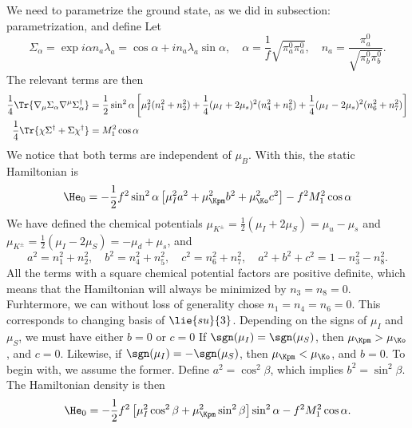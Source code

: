 \documentclass{book}
\begin{document}
We need to parametrize the ground state, as we did in {subsection: parametrization}, and define
Let
%
\begin{equation}
    \Sigma_\alpha 
    = \exp{i \alpha n_a \lambda_a} = \cos \alpha + i n_a \lambda_a \sin \alpha,
    \quad \alpha = \frac{1}{f} \sqrt{\pi_a^0 \pi_a^0}, \quad n_a = \frac{\pi_a^0}{\sqrt{\pi_b^0 \pi_b^0}}. 
\end{equation}
%
The relevant terms are then
%
\begin{align}
    \frac{1}{4} \Tr{\nabla_\mu \Sigma_\alpha \nabla^\mu \Sigma_\alpha^\dagger}
    & = \frac{1}{2} \sin^2\alpha
    \left[
        \mu_I^2 (n_1^2 + n_2^2) 
        + \frac{1}{4} (\mu_I + 2\mu_s)^2(n_4^2 + n_5^2)
        + \frac{1}{4} (\mu_I - 2\mu_s)^2(n_6^2 + n_7^2)
    \right]\\
    \frac{1}{4} \Tr{\chi \Sigma^\dagger + \Sigma \chi^\dagger} 
    & = M_1^2 \cos \alpha
\end{align}
%
We notice that both terms are independent of $\mu_B$.
With this, the static Hamiltonian is
%
\begin{align}
    \He_0
    = -\frac{1}{2}f^2\sin^2\alpha
    \left[
        \mu_I^2a^2 + \mu_\Kpm^2 b^2  + \mu_\Ko^2 c^2
    \right]
    - f^2M_1^2 \cos\alpha
\end{align}
%
We have defined the chemical potentials $\mu_{K^{\pm}} = \frac{1}{2}(\mu_I + 2 \mu_S) = \mu_u - \mu_s$ and $\mu_{K^{\pm}} = \frac{1}{2}(\mu_I - 2 \mu_S) = -\mu_d + \mu_s$, 
and
%
\begin{equation}
    a^2 = n_1^2 + n_2^2, \quad
    b^2 = n_4^2 + n_5^2, \quad
    c^2 = n_6^2 + n_7^2, \quad
    a^2 + b^2 + c^2 = 1 - n_3^2 - n_8^2.
\end{equation}
%
All the terms with a square chemical potential factors are positive definite, which means that the Hamiltonian will always be minimized by $n_3 = n_8 = 0$.
Furhtermore, we can without loss of generality chose $n_1 = n_4 = n_6 = 0$.
This corresponds to changing basis of $\lie{su}{3}$.
Depending on the signs of $\mu_I$ and $\mu_S$, we must have either $b = 0$ or $c = 0$
If $\sgn(\mu_I) = \sgn(\mu_S)$, then $\mu_\Kpm > \mu_\Ko$, and $c = 0$.
Likewise, if $\sgn(\mu_I) = - \sgn(\mu_S)$, then $\mu_\Kpm < \mu_\Ko$, and $b = 0$.
To begin with, we assume the former.
Define $a^2 = \cos^2\beta$, which implies $b^2 = \sin^2\beta$.
The Hamiltonian density is then
%
\begin{equation}
    \He_0 =
    -\frac{1}{2} f^2
    \left[
        \mu_I^2 \cos^2\beta + \mu_\Kpm^2\sin^2\beta
    \right]
    \sin^2\alpha
    -
    f^2 M_1^2 \cos\alpha.
\end{equation}
\end{document}
